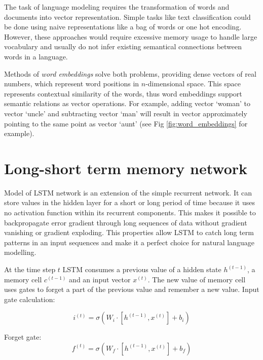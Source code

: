 The task of language modeling requires the transformation of words and documents into vector representation. Simple tasks like text classification could be done using naive representations like a bag of words or one hot encoding. However, these approaches would require excessive memory usage to handle large vocabulary and usually do not infer existing semantical connections between words in a language. 

Methods of \emph{word embeddings} solve both problems, providing dense vectors of real numbers, which represent word positions in $n$-dimensional space. This space represents contextual similarity of the words, thus word embeddings support semantic relations as vector operations. For example, adding vector ‘woman’ to vector ‘uncle’ and subtracting vector ‘man’ will result in vector approximately pointing to the same point as vector ‘aunt’ (see Fig \ref{fig:word_embeddings} for example).

\section{Long-short term memory network}
Model of LSTM network is an extension of the simple recurrent network. It can store values in the hidden layer for a short or long period of time because it uses no activation function within its recurrent components. This makes it possible to backpropagate error gradient through long sequences of data without gradient vanishing or gradient exploding. This properties allow LSTM to catch long term patterns in an input sequences and make it a perfect choice for natural language modelling.

At the time step $t$ LSTM consumes a previous value of a hidden state $h^{(t-1)}$, a memory cell $c^{(t-1)}$ and an input vector $x^{(t)}$. The new value of memory cell uses gates to forget a part of the previous value and remember a new value. Input gate calculation:

\begin{equation}
i^{(t)}=\sigma(W_i\cdot[h^{(t-1)}, x^{(t)}]+b_i)
\label{lstm:input}
\end{equation} 

Forget gate:
\begin{equation}
f^{(t)} = \sigma(W_f\cdot[h^{(t-1)},x^{(t)}] + b_f)
\label{lstm:ft}
\end{equation} 

